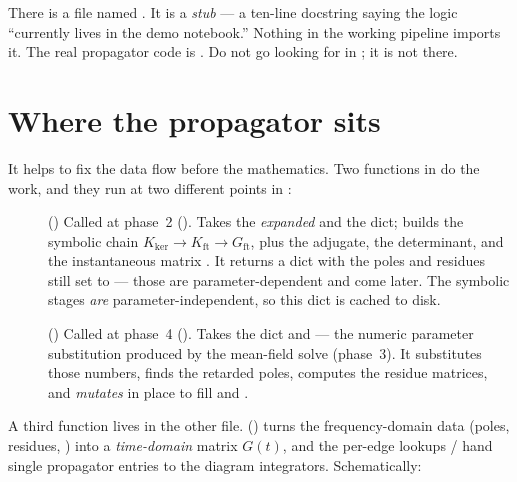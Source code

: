 \begin{gotcha}
There is a file named . It is a \emph{stub} --- a
ten-line docstring saying the logic ``currently lives in the demo notebook.''
Nothing in the working pipeline imports it. The real propagator code is
. Do not go looking for 
in ; it is not there.
\end{gotcha}

\section{Where the propagator sits}

It helps to fix the data flow before the mathematics. Two functions in
 do the work, and they run at two different points
in :

\begin{description}
  \item[] ()
        Called at phase~2 (). Takes the
        \emph{expanded}   and the  dict;
        builds the symbolic chain $K_{\mathrm{ker}} \to K_{\mathrm{ft}} \to
        G_{\mathrm{ft}}$, plus the adjugate, the determinant, and the
        instantaneous matrix . It returns a  dict with
        the poles and residues still set to  --- those are
        parameter-dependent and come later. The symbolic stages \emph{are}
        parameter-independent, so this dict is cached to disk.
  \item[] ()
        Called at phase~4 (). Takes the 
        dict and  --- the numeric parameter substitution
        produced by the mean-field solve (phase~3). It substitutes those numbers,
        finds the retarded poles, computes the residue matrices, and
        \emph{mutates}  in place to fill  and
        .
\end{description}

A third function lives in the other file. 
() turns the
frequency-domain data (poles, residues, ) into a \emph{time-domain}
matrix $G(t)$, and the per-edge lookups  /
 hand single propagator entries to the diagram
integrators. Schematically:

